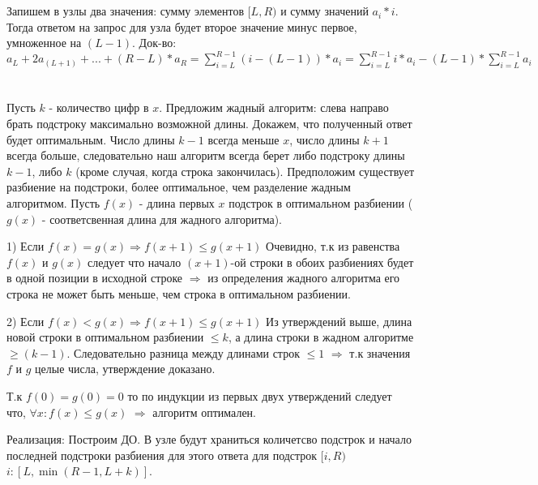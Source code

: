 \documentclass{article}
\begin{document}
\begin{flushleft}

\section{}
Запишем в узлы два значения: сумму элементов $[L, R)$ и сумму значений $a_i * i$. Тогда ответом на запрос для узла будет второе значение минус первое, умноженное на $(L - 1)$. Док-во: $a_L + 2a_{(L+1)} + ... + (R - L) * a_R = \sum\limits_{i = L}^{R - 1}{(i - (L - 1)) * a_i} = \sum\limits_{i = L}^{R - 1}{i * a_i} - (L - 1) * \sum\limits_{i = L}^{R - 1}{a_i}$

\section{}



\section{}
Пусть $k$ - количество цифр в $x$. Предложим жадный алгоритм: слева направо брать подстроку максимально возможной длины. Докажем, что полученный ответ будет оптимальным. Число длины $k - 1$ всегда меньше $x$, число длины $k + 1$ всегда больше, следовательно наш алгоритм всегда берет либо подстроку длины $k - 1$, либо $k$ (кроме случая, когда строка закончилась). Предположим существует разбиение на подстроки, более оптимальное, чем разделение жадным алгоритмом. Пусть $f(x)$ - длина первых $x$ подстрок в оптимальном разбиении ($g(x)$ - соответсвенная длина для жадного алгоритма). 

1) Если $f(x) = g(x) \Rightarrow f(x + 1) \le g(x + 1)$ Очевидно, т.к из равенства $f(x)$ и $g(x)$ следует что начало $(x + 1)$-ой строки в обоих разбиениях будет в одной позиции в исходной строке $\Rightarrow$ из определения жадного алгоритма его строка не может быть меньше, чем строка в оптимальном разбиении.


2) Если $f(x) < g(x) \Rightarrow f(x + 1) \le g(x + 1)$ Из утверждений выше, длина новой строки в оптимальном разбиении $\le k$, а длина строки в жадном алгоритме $\ge (k - 1)$. Следовательно разница между длинами строк $\le 1$ $\Rightarrow$ т.к значения $f$ и $g$ целые числа, утверждение доказано.

Т.к $f(0) = g(0) = 0$ то по индукции из первых двух утверждений следует что, $ \forall x: f(x) \le g(x)$ $\Rightarrow$ алгоритм оптимален.

Реализация: Построим ДО. В узле будут храниться количетсво подстрок и начало последней подстроки разбиения для этого ответа для подстрок $[i, R)$ $i: [L, \min(R - 1, L + k)]$.


\end{flushleft}
\end{document}
